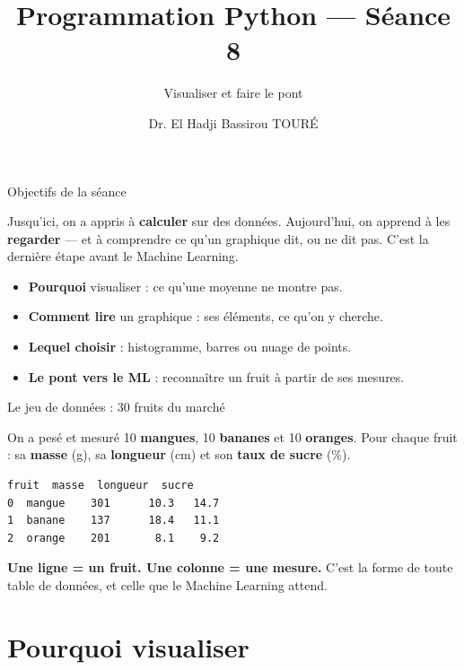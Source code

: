 \documentclass[aspectratio=169,11pt]{beamer}
\title{Programmation Python — Séance 8}
\subtitle{Visualiser et faire le pont}
\author{Dr. El Hadji Bassirou TOURÉ}
\institute{Département de Mathématiques et Informatique\\ Faculté des Sciences et Techniques\\ Université Cheikh Anta Diop de Dakar}
\date{}
\begin{document}
\begin{frame}\titlepage\end{frame}

\begin{frame}{Objectifs de la séance}
\begin{ucaddef}
{\small Jusqu'ici, on a appris à \textbf{calculer} sur des données. Aujourd'hui, on apprend à les \textbf{regarder} — et à comprendre ce qu'un graphique dit, ou ne dit pas. C'est la dernière étape avant le Machine Learning.}
\end{ucaddef}
\begin{itemize}\small
  \item \textbf{Pourquoi} visualiser : ce qu'une moyenne ne montre pas.
  \item \textbf{Comment lire} un graphique : ses éléments, ce qu'on y cherche.
  \item \textbf{Lequel choisir} : histogramme, barres ou nuage de points.
  \item \textbf{Le pont vers le ML} : reconnaître un fruit à partir de ses mesures.
\end{itemize}
\end{frame}

\begin{frame}[fragile]{Le jeu de données : 30 fruits du marché}
\begin{ucaddef}
{\small On a pesé et mesuré 10 \textbf{mangues}, 10 \textbf{bananes} et 10 \textbf{oranges}. Pour chaque fruit : sa \textbf{masse} (g), sa \textbf{longueur} (cm) et son \textbf{taux de sucre} (\%).}
\end{ucaddef}
\begin{lstlisting}[style=out]
    fruit  masse  longueur  sucre
0  mangue    301      10.3   14.7
1  banane    137      18.4   11.1
2  orange    201       8.1    9.2
\end{lstlisting}
{\small \textbf{Une ligne = un fruit. Une colonne = une mesure.} C'est la forme de toute table de données, et celle que le Machine Learning attend.}
\end{frame}

\section{Pourquoi visualiser}
\end{document}
